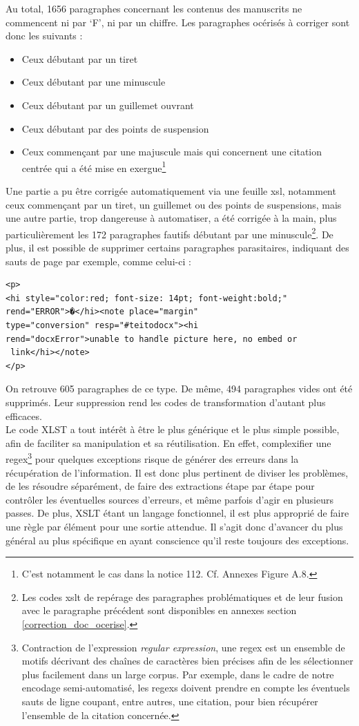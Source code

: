\documentclass[a4paper,12pt,twoside]{book}
\begin{document}
	Au total, 1656 paragraphes concernant les contenus des manuscrits ne commencent ni par ‘F’, ni par un chiffre. Les paragraphes océrisés à corriger sont donc les suivants :
	\begin{itemize}
	    \item Ceux débutant par un tiret
	    \item Ceux débutant par une minuscule
	    \item Ceux débutant par un guillemet ouvrant
	    \item Ceux débutant par des points de suspension
	    \item Ceux commençant par une majuscule mais qui concernent une citation centrée qui a été mise en exergue\footnote{C'est notamment le cas dans la notice 112. Cf. Annexes Figure A.8.}
	\end{itemize}
Une partie a pu être corrigée automatiquement via une feuille xsl, notamment ceux commençant par un tiret, un guillemet ou des points de suspensions, mais une autre partie, trop dangereuse à automatiser, a été corrigée à la main, plus particulièrement les 172 paragraphes fautifs débutant par une minuscule\footnote{Les codes xslt de repérage des paragraphes problématiques et de leur fusion avec le paragraphe précédent sont disponibles en annexes section \ref{correction_doc_ocerise}.}.
De plus, il est possible de supprimer certains paragraphes parasitaires, indiquant des sauts de page par exemple, comme celui-ci : 
\begin{verbatim}
<p>
<hi style="color:red; font-size: 14pt; font-weight:bold;" 
rend="ERROR">�</hi><note place="margin" 
type="conversion" resp="#teitodocx"><hi
rend="docxError">unable to handle picture here, no embed or
 link</hi></note>
</p>
\end{verbatim}
On retrouve 605 paragraphes de ce type. De même, 494 paragraphes vides ont été supprimés. Leur suppression rend les codes de transformation d’autant plus efficaces. \\

Le code XLST a tout intérêt à être le plus générique et le plus simple possible, afin de faciliter sa manipulation et sa réutilisation. En effet, complexifier une regex\footnote{Contraction de l'expression \textit{regular expression}, une regex est un ensemble de motifs décrivant des chaînes de caractères bien précises afin de les sélectionner plus facilement dans un large corpus. Par exemple, dans le cadre de notre encodage semi-automatisé, les regexs doivent prendre en compte les éventuels sauts de ligne coupant, entre autres, une citation, pour bien récupérer l'ensemble de la citation concernée.} pour quelques exceptions risque de générer des erreurs dans la récupération de l'information. Il est donc plus pertinent de diviser les problèmes, de les résoudre séparément, de faire des extractions étape par étape pour contrôler les éventuelles sources d'erreurs, et même parfois d'agir en plusieurs passes. De plus, XSLT étant un langage fonctionnel, il est plus approprié de faire une règle par élément pour une sortie attendue. Il s'agit donc d'avancer du plus général au plus spécifique en ayant conscience qu'il reste toujours des exceptions.\\
\end{document}
